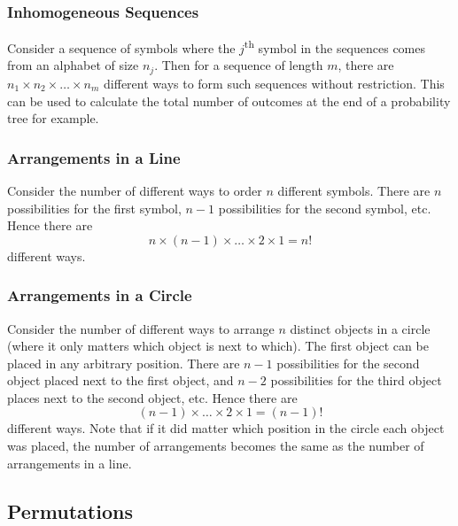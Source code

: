 \documentclass[11pt]{report} %
\begin{document}
\subsubsection{Inhomogeneous Sequences}
Consider a sequence of symbols where the $j$\textsuperscript{th} symbol in the sequences comes from an alphabet of size $n_{j}$. Then for a sequence of length $m$, there are $n_{1}\times n_{2}\times\dots\times n_{m}$ different ways to form such sequences without restriction. This can be used to calculate the total number of outcomes at the end of a probability tree for example.

\subsubsection{Arrangements in a Line}
Consider the number of different ways to order $n$ different symbols. There are $n$ possibilities for the first symbol, $n - 1$ possibilities for the second symbol, etc. Hence there are
\begin{equation}
n\times\left(n - 1\right)\times \dots\times 2\times 1 = n!
\end{equation}
different ways.

\subsubsection{Arrangements in a Circle}

Consider the number of different ways to arrange $n$ distinct objects in a circle (where it only matters which object is next to which). The first object can be placed in any arbitrary position. There are $n - 1$ possibilities for the second object placed next to the first object, and $n - 2$ possibilities for the third object places next to the second object, etc. Hence there are
\begin{equation}
\left(n - 1\right)\times \dots\times 2\times 1 = \left(n - 1\right)!
\end{equation}
different ways. Note that if it did matter which position in the circle each object was placed, the number of arrangements becomes the same as the number of arrangements in a line.

\subsection{Permutations}
\end{document}

